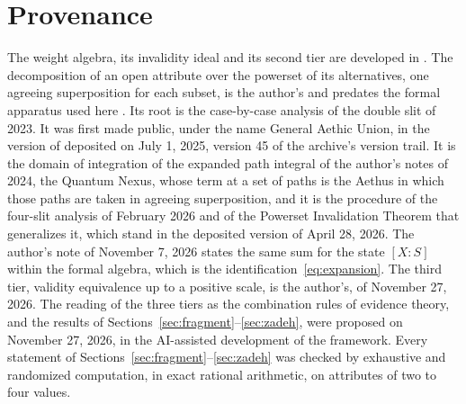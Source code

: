 \section*{Provenance}

\noindent The weight algebra, its invalidity ideal and its second tier are developed in \cite{Aethus, AethusTree}. The decomposition of an open attribute over the powerset of its alternatives, one agreeing superposition for each subset, is the author's and predates the formal apparatus used here \cite{Aethus}. Its root is the case-by-case analysis of the double slit of 2023. It was first made public, under the name General Aethic Union, in the version of \cite{Aethus} deposited on July 1, 2025, version 45 of the archive's version trail. It is the domain of integration of the expanded path integral of the author's notes of 2024, the Quantum Nexus, whose term at a set of paths is the Aethus in which those paths are taken in agreeing superposition, and it is the procedure of the four-slit analysis of February 2026 and of the Powerset Invalidation Theorem that generalizes it, which stand in the deposited version of April 28, 2026. The author's note of November 7, 2026 states the same sum for the state $[X:S]$ within the formal algebra, which is the identification~\eqref{eq:expansion}. The third tier, validity equivalence up to a positive scale, is the author's, of November 27, 2026. The reading of the three tiers as the combination rules of evidence theory, and the results of Sections~\ref{sec:fragment}--\ref{sec:zadeh}, were proposed on November 27, 2026, in the AI-assisted development of the framework. Every statement of Sections~\ref{sec:fragment}--\ref{sec:zadeh} was checked by exhaustive and randomized computation, in exact rational arithmetic, on attributes of two to four values.

\printbibliography

